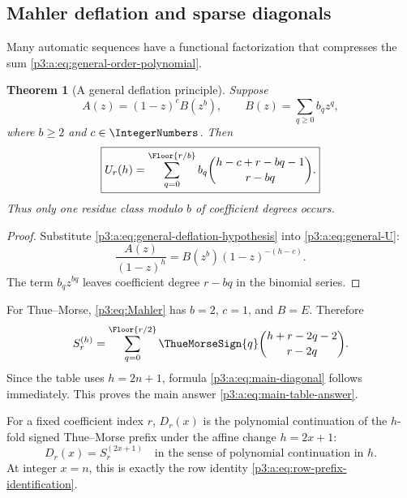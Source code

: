 \documentclass[11pt,oneside]{article}
\numberwithin{equation}{section}
\newtheorem{theorem}{Theorem}[section]
\theoremstyle{definition}
\theoremstyle{remark}
\begin{document}
\subsection{Mahler deflation and sparse diagonals}

Many automatic sequences have a functional factorization that compresses the
sum \eqref{p3:a:eq:general-order-polynomial}.

\begin{theorem}[A general deflation principle]
Suppose
\begin{equation}
 A(z)=(1-z)^cB(z^b),
 \qquad
 B(z)=\sum_{q\ge0}b_qz^q,
 \label{p3:a:eq:general-deflation-hypothesis}
\end{equation}
where \(b\ge2\) and \(c\in\IntegerNumbers\).  Then
\begin{equation}
 \boxed{
 U_r(h)=
 \sum_{q=0}^{\Floor{r/b}}b_q
 \binom{h-c+r-bq-1}{r-bq}.}
 \label{p3:a:eq:general-deflation}
\end{equation}
Thus only one residue class modulo \(b\) of coefficient degrees occurs.
\end{theorem}

\begin{proof}
Substitute \eqref{p3:a:eq:general-deflation-hypothesis} into
\eqref{p3:a:eq:general-U}:
\[
 \frac{A(z)}{(1-z)^h}=B(z^b)(1-z)^{-(h-c)}.
\]
The term \(b_qz^{bq}\) leaves coefficient degree \(r-bq\) in the binomial
series.
\end{proof}

For Thue--Morse, \eqref{p3:eq:Mahler} has \(b=2\), \(c=1\), and \(B=E\).
Therefore
\begin{equation}
 S_r^{(h)}
 =\sum_{q=0}^{\Floor{r/2}}
 \ThueMorseSign{q}\binom{h+r-2q-2}{r-2q}.
 \label{p3:a:eq:prefix-order-polynomial}
\end{equation}
Since the table uses \(h=2n+1\), formula \eqref{p3:a:eq:main-diagonal} follows
immediately.  This proves the main answer \eqref{p3:a:eq:main-table-answer}.

\begin{remark}[Interpretation]
For a fixed coefficient index \(r\), \(D_r(x)\) is the polynomial
continuation of the \(h\)-fold signed Thue--Morse prefix under the affine
change \(h=2x+1\):
\begin{equation}
 D_r(x)=S_r^{(2x+1)}
 \quad\text{in the sense of polynomial continuation in }h.
 \label{p3:a:eq:polynomial-interpolation-interpretation}
\end{equation}
At integer \(x=n\), this is exactly the row identity
\eqref{p3:a:eq:row-prefix-identification}.
\end{remark}
\end{document}
